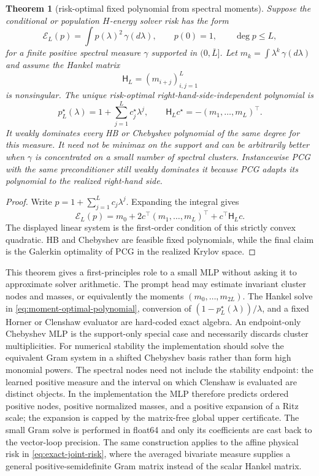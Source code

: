 \documentclass[11pt]{article}
\newtheorem{theorem}{Theorem}
\begin{document}
\begin{theorem}[risk-optimal fixed polynomial from spectral moments]
\label{thm:risk-optimal-moment-polynomial}
Suppose the conditional or population \(H\)-energy solver risk has the form
\[
 \mathcal E_L(p)=\int p(\lambda)^2\,\gamma(d\lambda),
 \qquad p(0)=1,\qquad \deg p\leq L,
\]
for a finite positive spectral measure \(\gamma\) supported in
\((0,\overline L]\).  Let \(m_k=\int\lambda^k\,\gamma(d\lambda)\) and assume
the Hankel matrix
\[
 \mathsf H_L=(m_{i+j})_{i,j=1}^L
\]
is nonsingular.  The unique risk-optimal right-hand-side-independent
polynomial is
\[
 p_L^\star(\lambda)=1+\sum_{j=1}^Lc_j^\star\lambda^j,
 \qquad
 \mathsf H_Lc^\star=-(m_1,\ldots,m_L)^\top .
 \label{eq:moment-optimal-polynomial}
\]
It weakly dominates every HB or Chebyshev polynomial of the same degree for
this measure.  It need not be minimax on the support and can be arbitrarily
better when \(\gamma\) is concentrated on a small number of spectral
clusters.  Instancewise PCG with the same preconditioner still weakly
dominates it because PCG adapts its polynomial to the realized right-hand
side.
\end{theorem}
\begin{proof}
Write \(p=1+\sum_{j=1}^Lc_j\lambda^j\).  Expanding the integral gives
\[
 \mathcal E_L(p)
 =m_0+2c^\top(m_1,\ldots,m_L)^\top+c^\top\mathsf H_Lc.
\]
The displayed linear system is the first-order condition of this strictly
convex quadratic.  HB and Chebyshev are feasible fixed polynomials, while
the final claim is the Galerkin optimality of PCG in the realized Krylov
space.
\end{proof}

This theorem gives a first-principles role to a small MLP without asking it to
approximate solver arithmetic.  The prompt head may estimate invariant
cluster nodes and masses, or equivalently the moments
\((m_0,\ldots,m_{2L})\).  The Hankel solve in
\eqref{eq:moment-optimal-polynomial}, conversion of
\((1-p_L^\star(\lambda))/\lambda\), and a fixed Horner or Clenshaw evaluator
are hard-coded exact algebra.  An endpoint-only Chebyshev MLP is the
support-only special case and necessarily discards cluster multiplicities.
For numerical stability the implementation should solve the equivalent Gram
system in a shifted Chebyshev basis rather than form high monomial powers.
The spectral nodes need not include the stability endpoint: the learned
positive measure and the interval on which Clenshaw is evaluated are distinct
objects.  In the implementation the MLP therefore predicts ordered positive
nodes, positive normalized masses, and a positive expansion of a Ritz scale;
the expansion is capped by the matrix-free global upper certificate.  The
small Gram solve is performed in float64 and only its coefficients are cast
back to the vector-loop precision.
The same construction applies to the affine physical risk in
\eqref{eq:exact-joint-risk}, where the averaged bivariate measure supplies a
general positive-semidefinite Gram matrix instead of the scalar Hankel
matrix.
\end{document}
